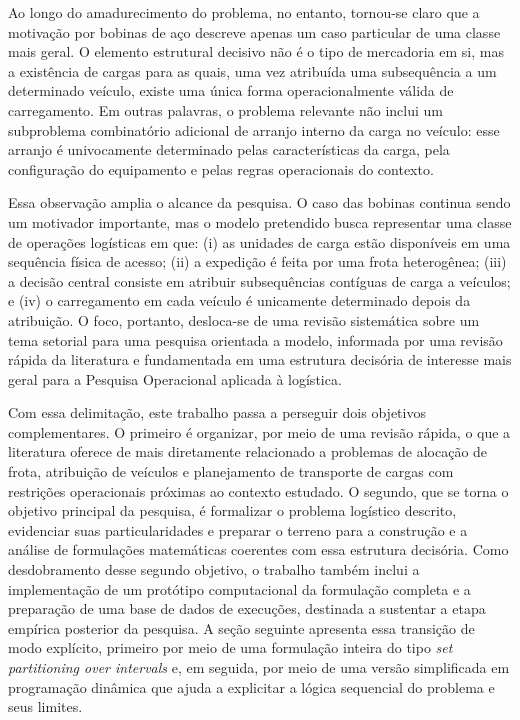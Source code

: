 Ao longo do amadurecimento do problema, no entanto, tornou-se claro que a
motivação por bobinas de aço descreve apenas um caso particular de uma classe
mais geral. O elemento estrutural decisivo não é o tipo de mercadoria em si,
mas a existência de cargas para as quais, uma vez atribuída uma subsequência a
um determinado veículo, existe uma única forma operacionalmente válida de
carregamento. Em outras palavras, o problema relevante não inclui um subproblema
combinatório adicional de arranjo interno da carga no veículo: esse arranjo é
univocamente determinado pelas características da carga, pela configuração do
equipamento e pelas regras operacionais do contexto.

Essa observação amplia o alcance da pesquisa. O caso das bobinas continua sendo
um motivador importante, mas o modelo pretendido busca representar uma classe de
operações logísticas em que: (i) as unidades de carga estão disponíveis em uma
sequência física de acesso; (ii) a expedição é feita por uma frota heterogênea;
(iii) a decisão central consiste em atribuir subsequências contíguas de carga a
veículos; e (iv) o carregamento em cada veículo é unicamente determinado depois
da atribuição. O foco, portanto, desloca-se de uma revisão sistemática sobre um
tema setorial para uma pesquisa orientada a modelo, informada por uma revisão
rápida da literatura e fundamentada em uma estrutura decisória de interesse mais
geral para a Pesquisa Operacional aplicada à logística.

Com essa delimitação, este trabalho passa a perseguir dois objetivos
complementares. O primeiro é organizar, por meio de uma revisão rápida, o que a
literatura oferece de mais diretamente relacionado a problemas de alocação de
frota, atribuição de veículos e planejamento de transporte de cargas com
restrições operacionais próximas ao contexto estudado. O segundo, que se torna o
objetivo principal da pesquisa, é formalizar o problema logístico descrito,
evidenciar suas particularidades e preparar o terreno para a construção e a
análise de formulações matemáticas coerentes com essa estrutura decisória. Como
desdobramento desse segundo objetivo, o trabalho também inclui a implementação
de um protótipo computacional da formulação completa e a preparação de uma base
de dados de execuções, destinada a sustentar a etapa empírica posterior da
pesquisa. A seção seguinte apresenta essa transição de modo explícito, primeiro
por meio de uma formulação inteira do tipo \emph{set partitioning over
intervals} e, em seguida, por meio de uma versão simplificada em programação
dinâmica que ajuda a explicitar a lógica sequencial do problema e seus limites.

